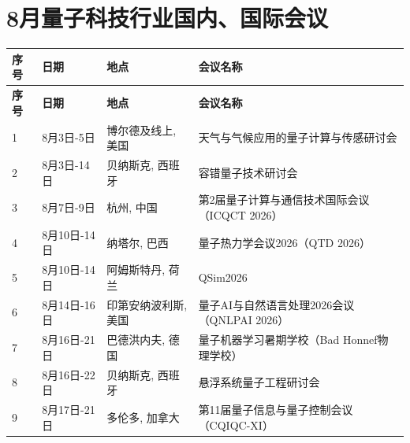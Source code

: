 \documentclass[12pt,a4paper]{ctexart}
\begin{document}
{
    \newpage
    \section*{ 8月量子科技行业国内、国际会议}
    \scriptsize
    \begin{longtable}{C{0.8cm}L{2.5cm}L{3cm}L{7cm}}
        \toprule[1.5pt]
        \textbf{序号} & \textbf{日期} & \textbf{地点} & \textbf{会议名称} \\
        \midrule
        \endfirsthead
        \toprule
        \textbf{序号} & \textbf{日期} & \textbf{地点} & \textbf{会议名称} \\
        \midrule
        \endhead
        \bottomrule
        \endfoot
        
        1 & 8月3日-5日 & 博尔德及线上, 美国 & 天气与气候应用的量子计算与传感研讨会 \\
        \midrule[0.05pt]
        
        2 & 8月3日-14日 & 贝纳斯克, 西班牙 & 容错量子技术研讨会 \\
        \midrule[0.05pt]
        
        3 & 8月7日-9日 & 杭州, 中国 & 第2届量子计算与通信技术国际会议（ICQCT 2026） \\
        \midrule[0.05pt]
        
        4 & 8月10日-14日 & 纳塔尔, 巴西 & 量子热力学会议2026（QTD 2026） \\
        \midrule[0.05pt]
        
        5 & 8月10日-14日 & 阿姆斯特丹, 荷兰 & QSim2026 \\
        \midrule[0.05pt]
        
        6 & 8月14日-16日 & 印第安纳波利斯, 美国 & 量子AI与自然语言处理2026会议（QNLPAI 2026） \\
        \midrule[0.05pt]
        
        7 & 8月16日-21日 & 巴德洪内夫, 德国 & 量子机器学习暑期学校（Bad Honnef物理学校） \\
        \midrule[0.05pt]
        
        8 & 8月16日-22日 & 贝纳斯克, 西班牙 & 悬浮系统量子工程研讨会 \\
        \midrule[0.05pt]
        
        9 & 8月17日-21日 & 多伦多, 加拿大 & 第11届量子信息与量子控制会议（CQIQC-XI） \\
        \midrule[0.05pt]
        

\end{longtable}}
\end{document}
